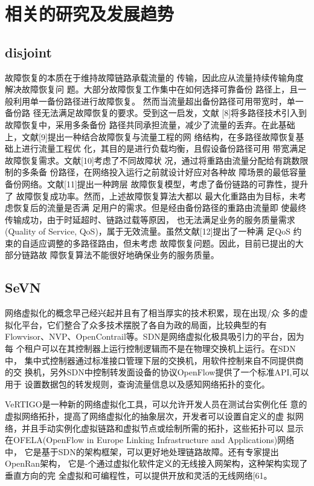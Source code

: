 \section{相关的研究及发展趋势}
\subsection{disjoint}
故障恢复的本质在于维持故障链路承载流量的
传输，因此应从流量持续传输角度解决故障恢复问
题。大部分故障恢复工作集中在如何选择可靠备份
路径上，且一般利用单一备份路径进行故障恢复。
然而当流量超出备份路径可用带宽时，单一备份路
径无法满足故障恢复的要求。受到这一启发，文献
[8]将多路径技术引入到故障恢复中，采用多条备份
路径共同承担流量，减少了流量的丢弃。在此基础
上，文献[9]提出一种结合故障恢复与流量工程的网
络结构，在多路径故障恢复基础上进行流量工程优
化，其目的是进行负载均衡，且假设备份路径可用
带宽满足故障恢复需求。文献[10]考虑了不同故障状
况，通过将重路由流量分配给有跳数限制的多条备
份路径，在网络投入运行之前就设计好应对各种故
障场景的最低容量备份网络。文献[11]提出一种跨层
故障恢复模型，考虑了备份链路的可靠性，提升了
故障恢复成功率。然而，上述故障恢复算法大都以
最大化重路由为目标，未考虑恢复后的流量是否满
足用户的需求。但是经由备份路径的重路由流量即
使最终传输成功，由于时延超时、链路过载等原因，
也无法满足业务的服务质量需求(Quality of Service,
QoS)，属于无效流量。虽然文献[12]提出了一种满
足QoS 约束的自适应调整的多路径路由，但未考虑
故障恢复问题。因此，目前已提出的大部分链路故
障恢复算法不能很好地确保业务的服务质量。

\subsection{SeVN}
网络虚拟化的概念早己经兴起并且有了相当厚实的技术积累，现在出现/众 多的虚拟化平台，它们整合了众多技术摆脱了各自为政的局面，比较典型的有 Flowvisor、NVP、OpenContrail等。SDN是网络虚拟化极具吸引力的平台，因为每 个租户可以在其控制器上运行控制逻辑而不是在物理交换机上运行。在SDN中， 集中式控制器通过标准接口管理下层的交换机，用软件控制来自不同提供商的交 换机，另外SDN中控制转发面设备的协议OpenFlow提供了一个标准API,可以用于 设置数据包的转发规则，查询流量信息以及感知网络拓扑的变化。

VeRTIGO是一种新的网络虚拟化工具，可以允许开发人员在测试台实例化任 意的虚拟网络拓扑，提高了网络虚拟化的抽象层次，开发者可以设置自定义的虚 拟网络，并且手动实例化虚拟链路和虚拟节点或绘制所需的拓扑，这些拓扑可以 显示在OFELA(OpenFlow in Europe Linking Infrastructure and Applications)网络中， 它是基于SDN的架构框架，可以更好地处理链路故障。还有专家提出OpenRan架构， 它是-个通过虚拟化软件定义的无线接入网架构，这种架构实现了垂直方向的完 全虚拟和可编程性，可以提供开放和灵活的无线网络[61。

